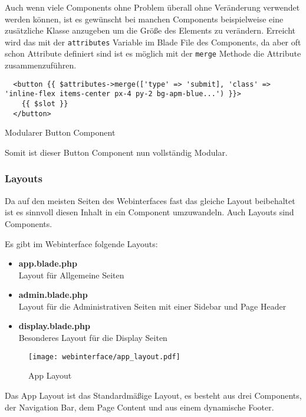 Auch wenn viele Components ohne Problem überall ohne Veränderung verwendet
werden können, ist es gewünscht bei manchen Components beispielweise eine
zusätzliche Klasse anzugeben um die Größe des Elements zu verändern. Erreicht
wird das mit der \verb|attributes| Variable im Blade File des Components, da
aber oft schon Attribute definiert sind ist es möglich mit der \verb|merge|
Methode die Attribute zusammenzuführen.


\begin{listing}[H]
  \begin{verbatim}
  <button {{ $attributes->merge(['type' => 'submit], 'class' => 'inline-flex items-center px-4 py-2 bg-apm-blue...') }}>
    {{ $slot }}
  </button>
  \end{verbatim}
  \caption{Modularer Button Component}
\end{listing}

Somit ist dieser Button Component nun vollständig Modular.


\subsubsection{Layouts}

Da auf den meisten Seiten des Webinterfaces fast das gleiche Layout beibehaltet
ist es sinnvoll diesen Inhalt in ein Component umzuwandeln. Auch Layouts sind
Components.

Es gibt im Webinterface folgende Layouts:

\begin{itemize}
  \item \textbf{app.blade.php}\\
  Layout für Allgemeine Seiten
  \item \textbf{admin.blade.php}\\
  Layout für die Administrativen Seiten mit einer Sidebar und Page Header
  \item \textbf{display.blade.php}\\
  Besonderes Layout für die Display Seiten
\end{itemize}

\begin{figure}[H]
  \centering
  \texttt{[image: webinterface/app\_layout.pdf]}
  \caption{App Layout}
\end{figure}

Das App Layout ist das Standardmäßige Layout, es besteht aus drei Components,
der Navigation Bar, dem Page Content und aus einem dynamische Footer.

